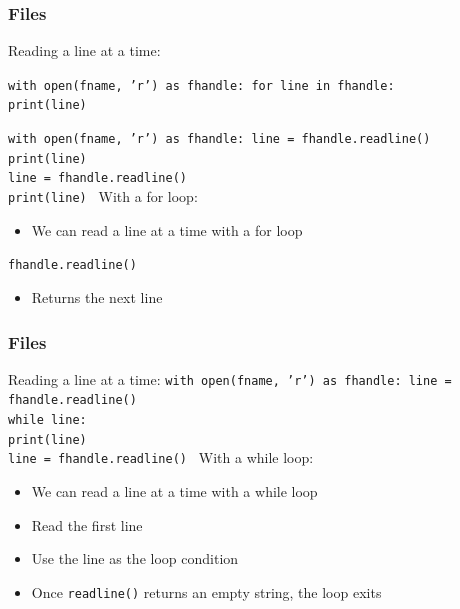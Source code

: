 \documentclass{beamer}
\newcommand{\code}[1]{\texttt{#1}}
\newcommand{\tab}{\hspace*{22pt}}
\begin{document}
\begin{frame}	
	\frametitle{Files}
	
	\begin{block}{Reading a line at a time:}
			\vspace{30pt}
			
			\code{with open(fname, 'r') as fhandle:
					\tab for line in fhandle: \\
					\tab \tab print(line)
			}
			
			\vspace{30pt}
			\code{with open(fname, 'r') as fhandle:
					\tab line = fhandle.readline() \\
					\tab print(line) \\
					\tab line = fhandle.readline() \\
					\tab print(line)
			}
		\endminipage\hfill
		\endminipage\hfill
			With a for loop:
			\begin{itemize}
				\item We can read a line at a time with a for loop
			\end{itemize}
			
			\vspace{20pt}
			\code{fhandle.readline()}
			\begin{itemize}
				\item Returns the next line
			\end{itemize}
		\endminipage\hfill
	\end{block}
	
\end{frame}

\begin{frame}	
	\frametitle{Files}
	
	\begin{block}{Reading a line at a time:}
			\code{with open(fname, 'r') as fhandle:
					\tab line = fhandle.readline() \\
					\tab while line: \\
					\tab \tab print(line) \\
					\tab \tab line = fhandle.readline()
			}
		\endminipage\hfill
		\endminipage\hfill
			With a while loop:
			\begin{itemize}
				\item We can read a line at a time with a while loop
				\item Read the first line
				\item Use the line as the loop condition
				\item Once \code{readline()} returns an empty string, the loop exits
			\end{itemize}
		\endminipage\hfill
	\end{block}
	
\end{frame}
\end{document}
